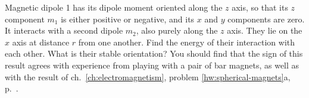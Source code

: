 Magnetic dipole 1 has its dipole moment oriented along the $z$ axis, so that
its $z$ component $m_1$ is either positive or negative, and its $x$ and $y$ components
are zero. It interacts with a second dipole $m_2$, also purely along the $z$ axis.
They lie on the $x$ axis at distance $r$ from one another. Find the energy of their
interaction with each other. What is their stable orientation? You should find
that the sign of this result agrees with experience from playing with a pair of bar magnets,
as well as with the result of ch.~\ref{ch:electromagnetism}, problem \ref{hw:spherical-magnets}a,
p.~\pageref{hw:spherical-magnets}.\answercheck
